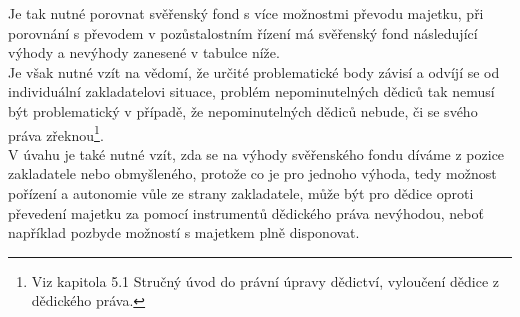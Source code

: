\documentclass{article}
\begin{document}



\newpage

Je tak nutné porovnat svěřenský fond s více možnostmi převodu majetku, při porovnání s převodem v pozůstalostním řízení má svěřenský fond následující výhody a nevýhody zanesené v tabulce níže.\\

Je však nutné vzít na vědomí, že určité problematické body závisí a odvíjí se od individuální zakladatelovi situace, problém nepominutelných dědiců tak nemusí být problematický v případě, že nepominutelných dědiců nebude, či se svého práva zřeknou\footnote{Viz kapitola 5.1 Stručný úvod do právní úpravy dědictví, vyloučení dědice z dědického práva.}.\\

V úvahu je také nutné vzít, zda se na výhody svěřenského fondu díváme z pozice zakladatele nebo obmyšleného, protože co je pro jednoho výhoda, tedy možnost pořízení a autonomie vůle ze strany zakladatele, může být pro dědice oproti převedení majetku za pomocí instrumentů dědického práva nevýhodou, neboť například pozbyde možností s majetkem plně disponovat. \\


\end{document}
